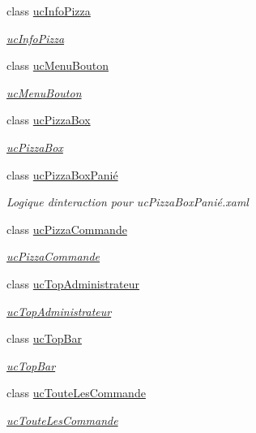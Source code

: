 \begin{DoxyCompactItemize}
class \hyperlink{classnewPizza1_1_1ucInfoPizza}{uc\+Info\+Pizza}
\begin{DoxyCompactList}\small\item\em \hyperlink{classnewPizza1_1_1ucInfoPizza}{uc\+Info\+Pizza} \end{DoxyCompactList}\item 
class \hyperlink{classnewPizza1_1_1ucMenuBouton}{uc\+Menu\+Bouton}
\begin{DoxyCompactList}\small\item\em \hyperlink{classnewPizza1_1_1ucMenuBouton}{uc\+Menu\+Bouton} \end{DoxyCompactList}\item 
class \hyperlink{classnewPizza1_1_1ucPizzaBox}{uc\+Pizza\+Box}
\begin{DoxyCompactList}\small\item\em \hyperlink{classnewPizza1_1_1ucPizzaBox}{uc\+Pizza\+Box} \end{DoxyCompactList}\item 
class \hyperlink{classnewPizza1_1_1ucPizzaBoxPani_xC3_xA9}{uc\+Pizza\+Box\+Panié}
\begin{DoxyCompactList}\small\item\em Logique d\textquotesingle{}interaction pour uc\+Pizza\+Box\+Panié.\+xaml \end{DoxyCompactList}\item 
class \hyperlink{classnewPizza1_1_1ucPizzaCommande}{uc\+Pizza\+Commande}
\begin{DoxyCompactList}\small\item\em \hyperlink{classnewPizza1_1_1ucPizzaCommande}{uc\+Pizza\+Commande} \end{DoxyCompactList}\item 
class \hyperlink{classnewPizza1_1_1ucTopAdministrateur}{uc\+Top\+Administrateur}
\begin{DoxyCompactList}\small\item\em \hyperlink{classnewPizza1_1_1ucTopAdministrateur}{uc\+Top\+Administrateur} \end{DoxyCompactList}\item 
class \hyperlink{classnewPizza1_1_1ucTopBar}{uc\+Top\+Bar}
\begin{DoxyCompactList}\small\item\em \hyperlink{classnewPizza1_1_1ucTopBar}{uc\+Top\+Bar} \end{DoxyCompactList}\item 
class \hyperlink{classnewPizza1_1_1ucTouteLesCommande}{uc\+Toute\+Les\+Commande}
\begin{DoxyCompactList}\small\item\em \hyperlink{classnewPizza1_1_1ucTouteLesCommande}{uc\+Toute\+Les\+Commande} \end{DoxyCompactList}\end{DoxyCompactItemize}
